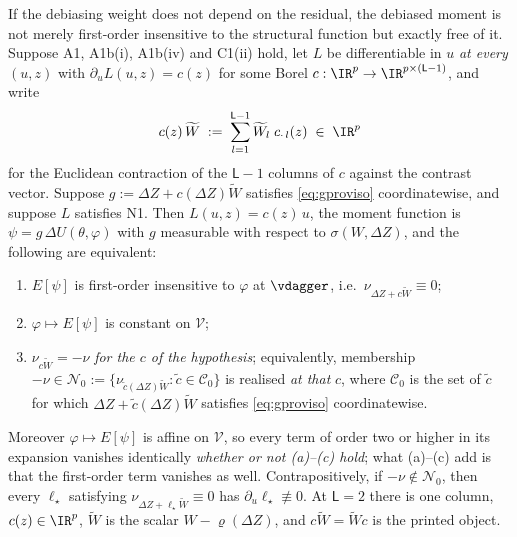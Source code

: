 \begin{corollary}\label{cor:udep}
If the debiasing weight does not depend on the residual, the debiased moment is not merely
first-order insensitive to the structural function but exactly free of it.
Suppose A1, A1b(i), A1b(iv) and C1(ii) hold, let $L$ be differentiable in $u$ \emph{at every} $(u,z)$
with $\partial_uL(u,z)=c(z)$ for some Borel $c:\IR^{p}\to\IR^{p\times(\mathsf L-1)}$, and write
\[
c(z)\,\widetilde W\;:=\;\sum_{l=1}^{\mathsf L-1}\widetilde W_l\;c_{\cdot\,l}(z)\;\in\;\IR^{p}
\]
for the Euclidean contraction of the $\mathsf L-1$ columns of $c$ against the contrast vector. Suppose
$g:=\Delta Z+c(\Delta Z)\widetilde W$ satisfies \eqref{eq:gproviso} coordinatewise, and suppose $L$
satisfies N1. Then
$L(u,z)=c(z)\,u$, the moment function is $\psi=g\,\Delta U(\theta,\varphi)$ with $g$ measurable with
respect to $\sigma(W,\Delta Z)$, and the following are equivalent:
\begin{enumerate}
\item[(a)] $E[\psi]$ is first-order insensitive to $\varphi$ at $\vdagger$, i.e.\
$\nu_{\Delta Z+c\widetilde W}\equiv0$;
\item[(b)] $\varphi\mapsto E[\psi]$ is constant on $\mathcal V$;
\item[(c)] $\nu_{c\widetilde W}=-\nu$ \emph{for the $c$ of the hypothesis}; equivalently, membership
$-\nu\in\mathcal N_0:=\{\nu_{\tilde c(\Delta Z)\widetilde W}:\tilde c\in\mathcal C_0\}$ is realised
\emph{at that} $c$, where $\mathcal C_0$ is the set of $\tilde c$ for which
$\Delta Z+\tilde c(\Delta Z)\widetilde W$ satisfies \eqref{eq:gproviso} coordinatewise.
\end{enumerate}
Moreover $\varphi\mapsto E[\psi]$ is affine on $\mathcal V$, so every term of order two or higher in its
expansion vanishes identically \emph{whether or not \textup{(a)--(c)} hold}; what \textup{(a)--(c)} add is
that the first-order term vanishes as well. Contrapositively, if $-\nu\notin\mathcal N_0$, then every
$\ell_\star$ satisfying $\nu_{\Delta Z+\ell_\star\widetilde W}\equiv0$ has
$\partial_u\ell_\star\not\equiv0$.
At $\mathsf L=2$ there is one column, $c(z)\in\IR^{p}$, $\widetilde W$ is the scalar
$W-\varrho(\Delta Z)$, and $c\widetilde W=\widetilde Wc$ is the printed object.
\end{corollary}

